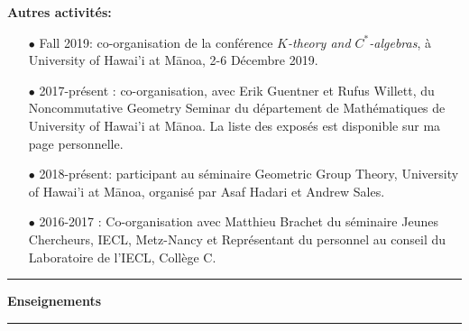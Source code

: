 \documentclass[a4paper,11pt]{article}
\newcommand{\titre}[1]{%
	\begin{center}
	\bigskip
	\rule{\textwidth}{1pt}
	\par\vspace{0.1cm}
        \textbf{\large #1}
	\par\rule{\textwidth}{1pt}
	\end{center}
	\bigskip
	}
\begin{document}
\textbf{Autres activit\'es:} 
\begin{itemize}
\item[$\bullet$] Fall 2019: co-organisation de la conf\'erence \textit{$K$-theory and $C^*$-algebras}, \`a University of Hawai'i at M\={a}noa, 2-6 D\'ecembre 2019. 
\item[$\bullet$] 2017-pr\'esent : co-organisation, avec Erik Guentner et Rufus Willett, du Noncommutative Geometry Seminar du d\'epartement de Math\'ematiques de University of Hawai'i at M\={a}noa. La liste des expos\'es est disponible sur ma page personnelle.
\item[$\bullet$] 2018-pr\'esent: participant au s\'eminaire Geometric Group Theory, University of Hawai'i at M\={a}noa, organis\'e par Asaf Hadari et Andrew Sales.
\item[$\bullet$] 2016-2017 : Co-organisation avec Matthieu Brachet du s\'eminaire Jeunes Chercheurs, IECL, Metz-Nancy et Représentant du personnel au conseil du Laboratoire de l'IECL, Collège C.
\end{itemize}

\newpage

\titre{Enseignements}
\end{document}

